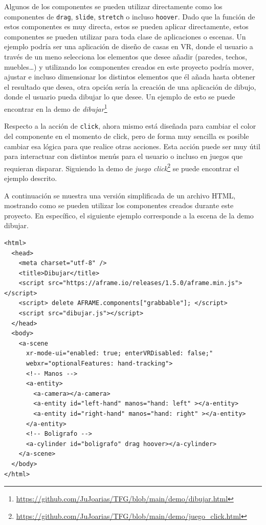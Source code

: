 \documentclass[a4paper, 12pt]{book}
\begin{document}
Algunos de los componentes se pueden utilizar directamente como los componentes de \texttt{drag}, \texttt{slide}, \texttt{stretch} o incluso \texttt{hoover}. Dado que la función de estos componentes es muy directa, estos se pueden aplicar directamente, estos componentes se pueden utilizar para toda clase de aplicaciones o escenas. Un ejemplo podría ser una aplicación de diseño de casas en VR,
donde el usuario a través de un meno selecciona los elementos que desee añadir (paredes, techos, muebles…) y utilizando los componentes creados en este proyecto podría mover, ajustar e incluso dimensionar los distintos elementos que él añada hasta obtener el resultado que desea, otra opción sería la creación de una aplicación de dibujo, donde el usuario pueda dibujar lo que desee. Un ejemplo de esto se puede encontrar en la demo de \textit{dibujar}\footnote{\url{https://github.com/JuJoarias/TFG/blob/main/demo/dibujar.html}} 

Respecto a la acción de \texttt{click}, ahora mismo está diseñada para cambiar el color del componente en el momento de click, pero de forma muy sencilla es posible cambiar esa lógica para que realice otras acciones. Esta acción puede ser muy útil para interactuar con distintos menús para el usuario o incluso en juegos que requieran disparar. Siguiendo la demo de \textit{juego click}\footnote{\url{https://github.com/JuJoarias/TFG/blob/main/demo/juego_click.html}} se puede encontrar el ejemplo descrito.

A continuación se muestra una versión simplificada de un archivo HTML, mostrando como se pueden utilizar los componentes creados durante este proyecto. En específico, el siguiente ejemplo corresponde a la escena de la demo dibujar.

\begin{lstlisting}[caption=Ejemplo de una escena, captionpos=b, label=lst:escena]
<html>
  <head>
    <meta charset="utf-8" />
    <title>Dibujar</title>
    <script src="https://aframe.io/releases/1.5.0/aframe.min.js"></script>
    <script> delete AFRAME.components["grabbable"]; </script>
    <script src="dibujar.js"></script>
  </head>
  <body>
    <a-scene 
      xr-mode-ui="enabled: true; enterVRDisabled: false;" 
      webxr="optionalFeatures: hand-tracking">
      <!-- Manos -->
      <a-entity>
        <a-camera></a-camera>
        <a-entity id="left-hand" manos="hand: left" ></a-entity>
        <a-entity id="right-hand" manos="hand: right" ></a-entity>
      </a-entity>
      <!-- Boligrafo -->
      <a-cylinder id="boligrafo" drag hoover></a-cylinder>
    </a-scene>
  </body>
</html>
\end{lstlisting}
\end{document}
